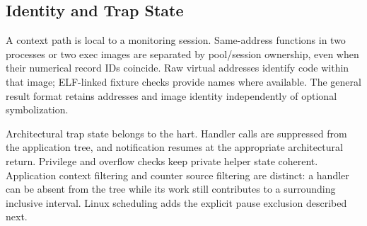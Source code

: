 \subsection{Identity and Trap State}
A context path is local to a monitoring session. Same-address functions in two processes or two exec images are separated by pool/session ownership, even when their numerical record IDs coincide. Raw virtual addresses identify code within that image; ELF-linked fixture checks provide names where available. The general result format retains addresses and image identity independently of optional symbolization.

Architectural trap state belongs to the hart. Handler calls are suppressed from the application tree, and notification resumes at the appropriate architectural return. Privilege and overflow checks keep private helper state coherent. Application context filtering and counter source filtering are distinct: a handler can be absent from the tree while its work still contributes to a surrounding inclusive interval. Linux scheduling adds the explicit pause exclusion described next.
